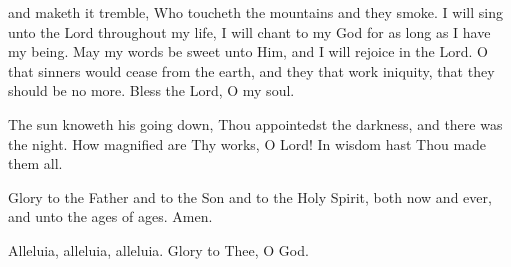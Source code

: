 \begin{liturgicaltext}
and maketh it tremble, Who toucheth the mountains and they smoke. I will sing unto the Lord throughout my life, I will chant to my God for as long as I have my being.  May my words be sweet unto Him, and I will rejoice in the Lord.  O that sinners would cease from the earth, and they that work iniquity, that they should be no more. Bless the Lord, O my soul. 
    \item[] The sun knoweth his going down, Thou appointedst the darkness, and there was the night.  How magnified are Thy works, O Lord!  In wisdom hast Thou made them all.
	\item[] Glory to the Father and to the Son and to the Holy Spirit, both now and ever, and unto the ages of ages. Amen. 
    \item[] Alleluia, alleluia, alleluia.  Glory to Thee, O God. 
\end{liturgicaltext}
